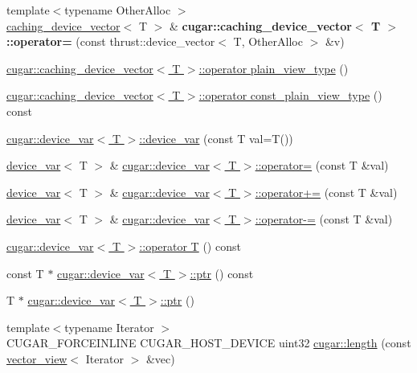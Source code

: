 \begin{DoxyCompactItemize}
\item 
\mbox{\label{group___basic_gabf5dbe15f009980167ffeacfbee6caf8}} 
{\footnotesize template$<$typename Other\+Alloc $>$ }\\\hyperlink{structcugar_1_1caching__device__vector}{caching\+\_\+device\+\_\+vector}$<$ T $>$ \& {\bfseries cugar\+::caching\+\_\+device\+\_\+vector$<$ T $>$\+::operator=} (const thrust\+::device\+\_\+vector$<$ T, Other\+Alloc $>$ \&v)
\item 
\hyperlink{group___basic_ga88dd1949f9871da3aa4d4aefd0167c8b}{cugar\+::caching\+\_\+device\+\_\+vector$<$ T $>$\+::operator plain\+\_\+view\+\_\+type} ()
\item 
\hyperlink{group___basic_gacf7a82dbc75f3ff33d4cb3bc1cae2e2f}{cugar\+::caching\+\_\+device\+\_\+vector$<$ T $>$\+::operator const\+\_\+plain\+\_\+view\+\_\+type} () const
\item 
\hyperlink{group___basic_ga011df6d3d281ae52a529e835ba1aad8e}{cugar\+::device\+\_\+var$<$ T $>$\+::device\+\_\+var} (const T val=T())
\item 
\hyperlink{structcugar_1_1device__var}{device\+\_\+var}$<$ T $>$ \& \hyperlink{group___basic_ga760fb65c25c56b5fa9f49144f1da3f9b}{cugar\+::device\+\_\+var$<$ T $>$\+::operator=} (const T \&val)
\item 
\hyperlink{structcugar_1_1device__var}{device\+\_\+var}$<$ T $>$ \& \hyperlink{group___basic_ga95f15b09320e473fc50c4df310d535fe}{cugar\+::device\+\_\+var$<$ T $>$\+::operator+=} (const T \&val)
\item 
\hyperlink{structcugar_1_1device__var}{device\+\_\+var}$<$ T $>$ \& \hyperlink{group___basic_ga882c904bab742504bd555bd688ddcd07}{cugar\+::device\+\_\+var$<$ T $>$\+::operator-\/=} (const T \&val)
\item 
\hyperlink{group___basic_ga64fde1bca016dd1b07ef0e7d6ef853ab}{cugar\+::device\+\_\+var$<$ T $>$\+::operator T} () const
\item 
const T $\ast$ \hyperlink{group___basic_ga7075a2df5b4208648b803def09b239d1}{cugar\+::device\+\_\+var$<$ T $>$\+::ptr} () const
\item 
T $\ast$ \hyperlink{group___basic_ga2073bcba54a5c135aa6dae8f0efbf20e}{cugar\+::device\+\_\+var$<$ T $>$\+::ptr} ()
\item 
{\footnotesize template$<$typename Iterator $>$ }\\C\+U\+G\+A\+R\+\_\+\+F\+O\+R\+C\+E\+I\+N\+L\+I\+NE C\+U\+G\+A\+R\+\_\+\+H\+O\+S\+T\+\_\+\+D\+E\+V\+I\+CE uint32 \hyperlink{group___basic_ga6a0f89325f62dc313d300e36f2a26b55}{cugar\+::length} (const \hyperlink{structcugar_1_1vector__view}{vector\+\_\+view}$<$ Iterator $>$ \&vec)

\end{DoxyCompactItemize}
